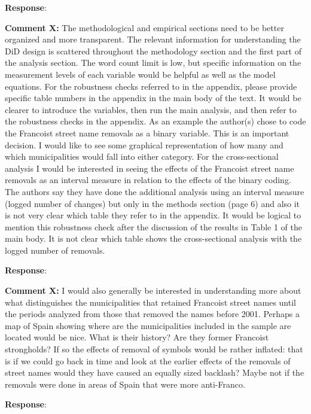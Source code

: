 \documentclass[12pt, a4paper, notitlepage]{article}
\begin{document}
\textbf{Response}: {\color{red}{pending}}

\textbf{Comment X:} The methodological and empirical sections need to be better organized and more transparent. The relevant information for understanding the DiD design is scattered throughout the methodology section and the first part of the analysis section. The word count limit is low, but specific information on the measurement levels of each variable would be helpful as well as the model equations. For the robustness checks referred to in the appendix, please provide specific table numbers in the appendix in the main body of the text. It would be clearer to introduce the variables, then run the main analysis, and then refer to the robustness checks in the appendix. As an example the author(s) chose to code the Francoist street name removals as a binary variable. This is an important decision. I would like to see some graphical representation of how many and which municipalities would fall into either category. For the cross-sectional analysis I would be interested in seeing the effects of the Francoist street name removals as an interval measure in relation to the effects of the binary coding. The authors say they have done the additional analysis using an interval measure (logged number of changes) but only in the methods section (page 6) and also it is not very clear which table they refer to in the appendix. It would be logical to mention this robustness check after the discussion of the results in Table 1 of the main body. It is not clear which table shows the cross-sectional analysis with the logged number of removals.

\textbf{Response}: {\color{red}{pending}}

\textbf{Comment X:} I would also generally be interested in understanding more about what distinguishes the municipalities that retained Francoist street names until the periods analyzed from those that removed the names before 2001. Perhaps a map of Spain showing where are the municipalities included in the sample are located would be nice. What is their history? Are they former Francoist strongholds? If so the effects of removal of symbols would be rather inflated: that is if we could go back in time and look at the earlier effects of the removals of street names would they have caused an equally sized backlash? Maybe not if the removals were done in areas of Spain that were more anti-Franco.

\textbf{Response}: {\color{red}{pending}}
\end{document}
